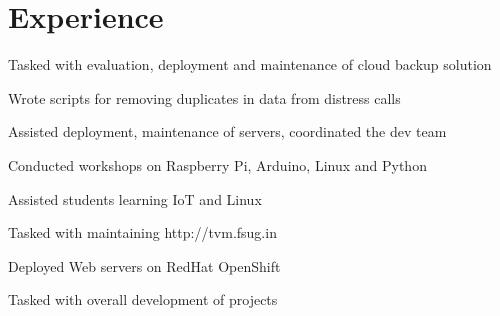 \documentclass[]{resume_karuvally_openfont}
\begin{document}
\hfill
\begin{minipage}[t]{0.66\textwidth} 


\section{Experience}

\vspace{\topsep} %
\begin{tightemize}
\item Tasked with evaluation, deployment and maintenance of cloud backup
    solution
\end{tightemize}
\sectionsep

\begin{tightemize}
\item Wrote scripts for removing duplicates in data from distress calls
\item Assisted deployment, maintenance of servers, coordinated the dev team
\end{tightemize}
\sectionsep

\begin{tightemize}
\item Conducted workshops on Raspberry Pi, Arduino, Linux and Python
\item Assisted students learning IoT and Linux
\end{tightemize}
\sectionsep

\begin{tightemize}
\item Tasked with maintaining http://tvm.fsug.in 
\end{tightemize}
\sectionsep

\begin{tightemize}
\item Deployed Web servers on RedHat OpenShift
\item Tasked with overall development of projects 
\end{tightemize}
\sectionsep


\end{minipage}
\end{document}
